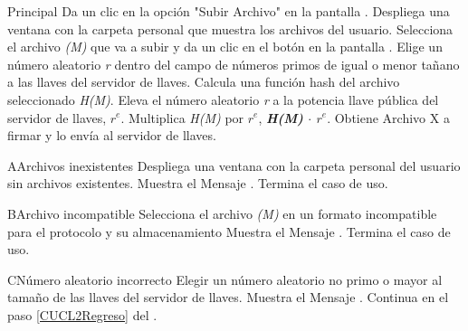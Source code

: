 \begin{UCtrayectoria}{Principal}
	\UCpaso[\UCactor] Da un clic en la opción "Subir Archivo" en la pantalla .
	\UCpaso Despliega una ventana con la carpeta personal que muestra los archivos del usuario. 
	\UCpaso[\UCactor] Selecciona el archivo \textit{(M)} que va a subir y da un clic en el botón \IUbuttonAceptar en la pantalla . 
	\UCpaso Elige un número aleatorio \textit{r} dentro del campo de números primos de igual o menor tañano a las llaves del servidor de llaves.  \label{CUCL2Regreso}
	\UCpaso Calcula una función hash del archivo seleccionado \textit{H(M)}.
	\UCpaso Eleva el número aleatorio \textit{r} a la potencia llave pública del servidor de llaves,  \textit{$r^{e}$}. 
	\UCpaso Multiplica \textit{H(M)} por \textit{$r^{e}$}, \textbf{\textit{H(M)} $\cdot$ \textit{$r^{e}$}}.
	\UCpaso Obtiene Archivo X a firmar y lo envía al servidor de llaves.
\end{UCtrayectoria}


		
\begin{UCtrayectoriaA}{A}{Archivos inexistentes}
	\UCpaso Despliega una ventana con la carpeta personal del usuario sin archivos existentes.
	\UCpaso Muestra el Mensaje .
	\UCpaso Termina el caso de uso.
\end{UCtrayectoriaA}

\begin{UCtrayectoriaA}{B}{Archivo incompatible}
	\UCpaso [\UCactor] Selecciona el archivo \textit{(M)} en un formato incompatible para el protocolo y su almacenamiento
	\UCpaso Muestra el Mensaje .
	\UCpaso Termina el caso de uso.
\end{UCtrayectoriaA}

\begin{UCtrayectoriaA}{C}{Número aleatorio incorrecto}
	\UCpaso Elegir un número aleatorio no primo o mayor al tamaño de las llaves del servidor de llaves.
	\UCpaso Muestra el Mensaje .
	\UCpaso Continua en el paso \ref{CUCL2Regreso} del .
\end{UCtrayectoriaA}

